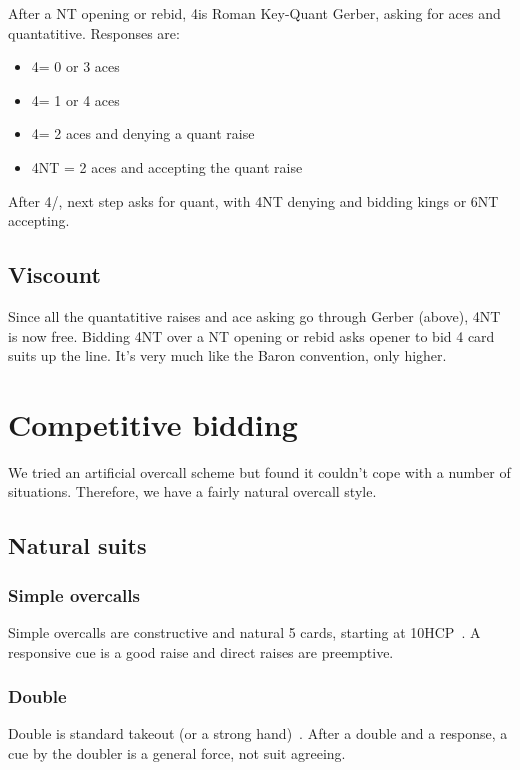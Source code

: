 \documentclass[a4paper,14pt]{extarticle}
\begin{document}
After a NT opening or rebid, 4\clubs is Roman Key-Quant Gerber, asking for
aces and quantatitive. Responses are:

\begin{itemize}
	\item 4\diamonds = 0 or 3 aces
	\item 4\hearts = 1 or 4 aces
	\item 4\spades = 2 aces and denying a quant raise
	\item 4NT = 2 aces and accepting the quant raise
\end{itemize}

After 4\diamonds/\hearts, next step asks for quant, with 4NT denying
and bidding kings or 6NT accepting.

\subsection{Viscount}
\label{sec:viscount}
\label{note:23}

Since all the quantatitive raises and ace asking go through Gerber (above), 4NT
is now free. Bidding 4NT over a NT opening or rebid asks opener to bid 4 card
suits up the line. It's very much like the Baron convention, only higher.

\section{Competitive bidding}
\label{sec:competitive}

We tried an artificial overcall scheme but found it couldn't cope with a number of situations.
Therefore, we have a fairly natural overcall style.

\subsection{Natural suits}
\label{sec:def:1x}

\subsubsection{Simple overcalls}
\label{note:11}
Simple overcalls are constructive and natural 5 cards, starting at
10HCP~. A responsive cue is a good raise and
direct raises are preemptive.

\subsubsection{Double}
Double is standard takeout (or a strong hand)~. After a double and
a response, a cue by the doubler is a general force, not suit agreeing.
\end{document}
